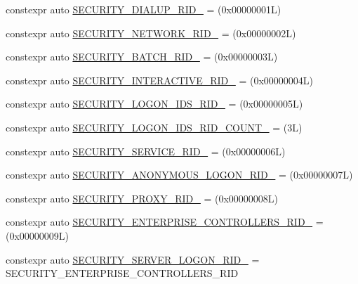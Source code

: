 \begin{DoxyCompactItemize}
\item 
constexpr auto \mbox{\hyperlink{namespaceboost_1_1winapi_ab3941029cefcec5fd925f51642034d9a}{S\+E\+C\+U\+R\+I\+T\+Y\+\_\+\+D\+I\+A\+L\+U\+P\+\_\+\+R\+I\+D\+\_\+}} = (0x00000001\+L)
\item 
constexpr auto \mbox{\hyperlink{namespaceboost_1_1winapi_ae779d60054eef23b70a4f71f0b3f31f4}{S\+E\+C\+U\+R\+I\+T\+Y\+\_\+\+N\+E\+T\+W\+O\+R\+K\+\_\+\+R\+I\+D\+\_\+}} = (0x00000002\+L)
\item 
constexpr auto \mbox{\hyperlink{namespaceboost_1_1winapi_a6946443f9bc88c67f046838ed6b5b51a}{S\+E\+C\+U\+R\+I\+T\+Y\+\_\+\+B\+A\+T\+C\+H\+\_\+\+R\+I\+D\+\_\+}} = (0x00000003\+L)
\item 
constexpr auto \mbox{\hyperlink{namespaceboost_1_1winapi_a9cc55a354e113de8424912ca698edbd9}{S\+E\+C\+U\+R\+I\+T\+Y\+\_\+\+I\+N\+T\+E\+R\+A\+C\+T\+I\+V\+E\+\_\+\+R\+I\+D\+\_\+}} = (0x00000004\+L)
\item 
constexpr auto \mbox{\hyperlink{namespaceboost_1_1winapi_affe7389a539a44c32b51def80c5a0cba}{S\+E\+C\+U\+R\+I\+T\+Y\+\_\+\+L\+O\+G\+O\+N\+\_\+\+I\+D\+S\+\_\+\+R\+I\+D\+\_\+}} = (0x00000005\+L)
\item 
constexpr auto \mbox{\hyperlink{namespaceboost_1_1winapi_a886e85f5d4569adcd2a2438c6bc9c955}{S\+E\+C\+U\+R\+I\+T\+Y\+\_\+\+L\+O\+G\+O\+N\+\_\+\+I\+D\+S\+\_\+\+R\+I\+D\+\_\+\+C\+O\+U\+N\+T\+\_\+}} = (3\+L)
\item 
constexpr auto \mbox{\hyperlink{namespaceboost_1_1winapi_aa7527f5cb805f2df991fd195800ea93a}{S\+E\+C\+U\+R\+I\+T\+Y\+\_\+\+S\+E\+R\+V\+I\+C\+E\+\_\+\+R\+I\+D\+\_\+}} = (0x00000006\+L)
\item 
constexpr auto \mbox{\hyperlink{namespaceboost_1_1winapi_abdd5ed9e8e9015a63378778f1f752834}{S\+E\+C\+U\+R\+I\+T\+Y\+\_\+\+A\+N\+O\+N\+Y\+M\+O\+U\+S\+\_\+\+L\+O\+G\+O\+N\+\_\+\+R\+I\+D\+\_\+}} = (0x00000007\+L)
\item 
constexpr auto \mbox{\hyperlink{namespaceboost_1_1winapi_ad71862c3d8d58b6d9a4682959266d52b}{S\+E\+C\+U\+R\+I\+T\+Y\+\_\+\+P\+R\+O\+X\+Y\+\_\+\+R\+I\+D\+\_\+}} = (0x00000008\+L)
\item 
constexpr auto \mbox{\hyperlink{namespaceboost_1_1winapi_a5878c50e36c866c30a239d8d0cfd6f0b}{S\+E\+C\+U\+R\+I\+T\+Y\+\_\+\+E\+N\+T\+E\+R\+P\+R\+I\+S\+E\+\_\+\+C\+O\+N\+T\+R\+O\+L\+L\+E\+R\+S\+\_\+\+R\+I\+D\+\_\+}} = (0x00000009\+L)
\item 
constexpr auto \mbox{\hyperlink{namespaceboost_1_1winapi_aba0b019b037df3a6ce438ad9616d59ca}{S\+E\+C\+U\+R\+I\+T\+Y\+\_\+\+S\+E\+R\+V\+E\+R\+\_\+\+L\+O\+G\+O\+N\+\_\+\+R\+I\+D\+\_\+}} = S\+E\+C\+U\+R\+I\+T\+Y\+\_\+\+E\+N\+T\+E\+R\+P\+R\+I\+S\+E\+\_\+\+C\+O\+N\+T\+R\+O\+L\+L\+E\+R\+S\+\_\+\+R\+ID

\end{DoxyCompactItemize}
